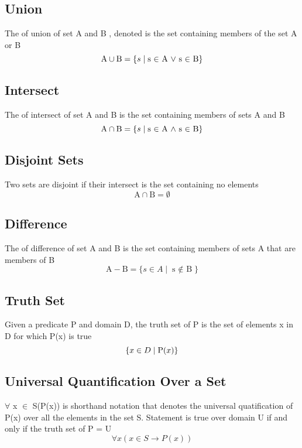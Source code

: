 \documentclass[12pt]{article}
\begin{document}
\subsection{Union}
The of union of set A and B , denoted 
is the set containing members of the set A or B
\begin{equation}
\mbox{A} \cup \mbox{B} = \{s\mid\text{s $\in$ A $\lor$ s $\in$ B}\}$$
$$\end{equation}

\subsection{Intersect}
The of intersect of set A and B 
is the set containing members of sets A and B
\begin{equation}
\mbox{A} \cap \mbox{B} = \{s\mid\text{s $\in$ A $\wedge$ s $\in$ B}\}$$
$$\end{equation}

\subsection{Disjoint Sets}
Two sets are disjoint if their intersect is the set containing no elements
\begin{equation}
\mbox{A} \cap \mbox{B} = \emptyset
\end{equation}

\subsection{Difference}
The of difference of set A and B 
is the set containing members of sets A 
that are members of B
\begin{equation}
\mbox{A} - \mbox{B} = \{ s \in A \mid\text{s $\not \in$ B} \}
\end{equation}

\subsection{Truth Set}
Given a predicate P and domain D, the truth set of P 
is 
the set of elements x in D for which P(x) is true
\begin{equation}
\{ x \in D \mid\text P(x) \}
\end{equation}

\subsection{Universal Quantification Over a Set}
$\forall$ x $\in$ S(P(x)) is shorthand notation that denotes
the universal quatification of P(x) over all the elements in the set S.
Statement is true over domain U 
if and only if
the truth set of P = U
\begin{equation}
\forall x \left( x \in S \rightarrow P(x) \right)
\end{equation}
\end{document}
